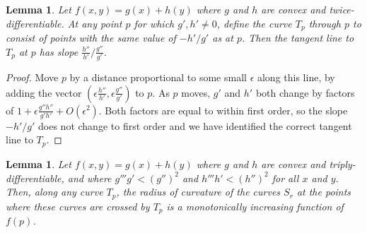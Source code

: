 \documentclass[10pt, conference, compsocconf]{IEEEtran}
\newtheorem{lemma}[theorem]{Lemma}
\begin{document}
\begin{lemma}
Let $f(x,y)=g(x)+h(y)$ where $g$ and $h$ are convex and twice-differentiable.
At any point $p$ for which $g',h'\ne 0$, define the curve $T_p$ through $p$ to consist of points with the same value of $-h'/g'$ as at $p$. Then the tangent line to $T_p$ at $p$ has slope $\frac{h''}{h'}/\frac{g''}{g'}$.
\end{lemma}

\begin{proof}
Move $p$ by a distance proportional to some small $\epsilon$ along this line, by adding the vector $(\epsilon\frac{h''}{h'},\epsilon\frac{g''}{g'})$ to $p$. As $p$ moves, $g'$ and $h'$ both change by factors of $1+\epsilon\frac{g''h''}{g'h'}+O(\epsilon^2)$. Both factors are equal to within first order, so the slope $-h'/g'$ does not change to first order and we have identified the correct tangent line to $T_p$.
\end{proof}

\begin{lemma}
\label{lem:curvature}
Let $f(x,y)=g(x)+h(y)$ where $g$ and $h$ are convex and triply-differentiable, and where $g'''g' < (g'')^2$ and $h'''h' < (h'')^2$ for all $x$ and $y$. Then, along any curve $T_p$, the radius of curvature of the curves $S_r$ at the points where these curves are crossed by $T_p$ is a monotonically increasing function of $f(p)$.
\end{lemma}
\end{document}
